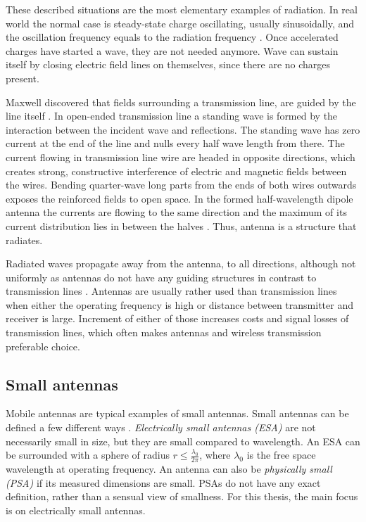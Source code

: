 These described situations are the most elementary examples of radiation. In real world the normal case is steady-state charge oscillating, usually sinusoidally, and the oscillation frequency equals to the radiation frequency \cite{stutzman}. Once accelerated charges have started a wave, they are not needed anymore. Wave can sustain itself by closing electric field lines on themselves, since there are no charges present. %

Maxwell discovered that fields surrounding a transmission line, are guided by the line itself \cite{stutzman}. In open-ended transmission line a standing wave is formed by the interaction between the incident wave and reflections. The standing wave has zero current at the end of the line and nulls every half wave length from there. The current flowing in transmission line wire are headed in opposite directions, which creates strong, constructive interference of electric and magnetic fields between the wires. Bending quarter-wave long parts from the ends of both wires outwards exposes the reinforced fields to open space. In the formed half-wavelength dipole antenna the currents are flowing to the same direction and the maximum of its current distribution lies in between the halves \cite{stutzman}. Thus, antenna is a structure that radiates. %

Radiated waves propagate away from the antenna, to all directions, although not uniformly as antennas do not have any guiding structures in contrast to transmission lines \cite{stutzman}. Antennas are usually rather used than transmission lines when either the operating frequency is high or distance between transmitter and receiver is large. Increment of either of those increases costs and signal losses of transmission lines, which often makes antennas and wireless transmission preferable choice. %


\subsection{Small antennas}
\label{sec:small_antennas}
Mobile antennas are typical examples of small antennas. Small antennas can be defined a few different ways \cite{modern_small_antennas}. \emph{Electrically small antennas (ESA)} are not necessarily small in size, but they are small compared to wavelength. An ESA can be surrounded with a sphere of radius $r\leq\frac{\lambda_0}{2\pi}$, where $\lambda_0$ is the free space wavelength at operating frequency. An antenna can also be \emph{physically small (PSA)} if its measured dimensions are small. PSAs do not have any exact definition, rather than a sensual view of smallness. For this thesis, the main focus is on electrically small antennas.

